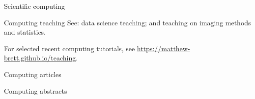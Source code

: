 \documentclass{cv}
\begin{document}
\begin{cvSection}{Scientific computing}
\begin{cvSubSection}{Computing teaching}
    See: data science teaching; and teaching on imaging methods and statistics.

    For selected recent computing tutorials, see
    \url{https://matthew-brett.github.io/teaching}.

\end{cvSubSection}

\begin{cvSubSection}{Computing articles}

\printbibliography[heading=none,
    keyword=computing,
    keyword=article,
notkeyword=omit]

\end{cvSubSection}

\begin{cvSubSection}{Computing abstracts}

\printbibliography[heading=none,
    keyword=computing,
    keyword=abstract,
notkeyword=omit]

\end{cvSubSection}

\end{cvSection}
\end{document}
